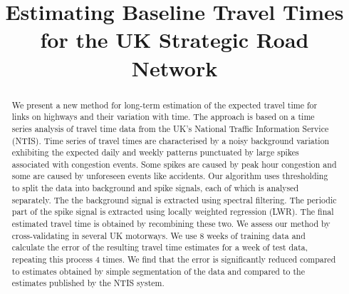 \documentclass[conference, letterpaper]{IEEEtran}
\begin{document}
\title{Estimating Baseline Travel Times for the UK Strategic Road Network
}

\author{
\and
{}
\and
{}
}

\maketitle

\begin{abstract}
We present a new method for long-term estimation of the expected travel time for links on highways and their variation with time.  
The approach is based on a time series analysis of travel time data from the UK's National Traffic Information Service (NTIS).  
Time series of travel times are characterised by a noisy background variation exhibiting the expected daily and weekly patterns punctuated by large spikes associated with congestion events. 
Some spikes are caused by peak hour congestion and some are caused by unforeseen events like accidents. 
Our algorithm uses thresholding to split the data into background and spike signals, each of which is analysed separately. 
The the background signal is extracted using spectral filtering. 
The periodic part of the spike signal is extracted using locally weighted regression (LWR). 
The final estimated travel time is obtained by recombining these two. 
We assess our method by cross-validating in several UK motorways. 
We use 8 weeks of training data and calculate the error of the resulting travel time estimates for a week of test data, repeating this process 4 times. 
We find that the error is significantly reduced compared to estimates obtained by simple segmentation of the data and compared to the estimates published by the NTIS system.
\end{abstract}
\end{document}
